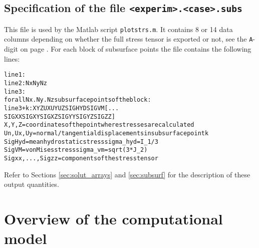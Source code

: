 \documentclass[12pt]{report}
\begin{document}
\section{Specification of the file {\tt <experim>.<case>.subs}}
\label{sec:spec_subs}

This file is used by the Matlab script {\tt plotstrs.m}. It contains 8
or 14 data columns depending on whether the full stress tensor is
exported or not, see the {\tt A}-digit on page \pageref{a-digit}. For each
block of subsurface points the file contains the following lines:
\begin{alltt}\small
  line 1: % comment line, describing variables on second line
  line 2:   Nx  Ny  Nz
  line 3: % comment line, describing columns of the table
  for all Nx.Ny.Nz subsurface points of the block:
     line 3+k:  X   Y   Z   UX   UY   UZ   SIGHYD  SIGVM [ ...
                                 SIGXX  SIGXY  SIGXZ  SIGYY SIGYZ  SIGZZ ]
  X,Y,Z    = coordinates of the point where stresses are calculated
  Un,Ux,Uy = normal/tangential displacements in subsurface point k
  SigHyd   = mean hydrostatic stress sigma_hyd = I_1/3
  SigVM    = von Mises stress sigma_vm = sqrt(3*J_2)
  Sigxx,...,Sigzz = components of the stress tensor
\end{alltt}
Refer to Sections \ref{sec:solut_arrays} and \ref{sec:subsurf} for the
description of these output quantities.


\chapter{Overview of the computational model}
\label{chp:comput_model}
\end{document}

